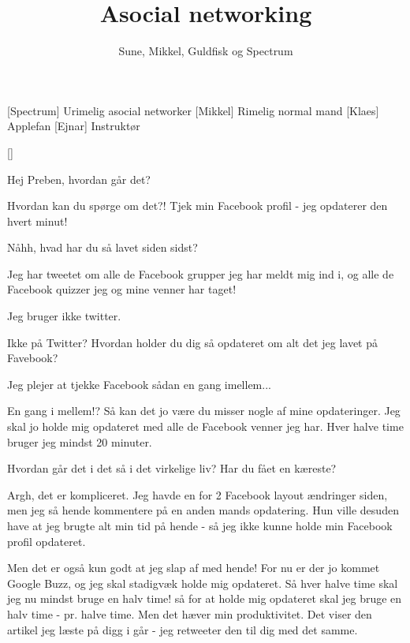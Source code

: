 \documentclass[a4paper,11pt]{article}
\title{Asocial networking}
\author{Sune, Mikkel, Guldfisk og Spectrum}
\begin{document}
\maketitle

\begin{roles}
       [Spectrum] Urimelig asocial networker
       [Mikkel] Rimelig normal mand
       [Klaes] Applefan
       [Ejnar] Instrukt\o{}r
\end{roles}

\begin{props}
[]
\end{props}

\begin{sketch}



 Hej Preben, hvordan g\aa{}r det?

  Hvordan kan du sp\o{}rge om det?! Tjek min Facebook profil - jeg opdaterer den hvert minut!

 N\aa{}hh, hvad har du s\aa{} lavet siden sidst?

 Jeg har tweetet om alle de Facebook grupper jeg har meldt mig ind i, og alle de Facebook quizzer jeg og mine venner har taget!

 Jeg bruger ikke twitter.

 Ikke p\aa{} Twitter? Hvordan holder du dig s\aa{} opdateret om alt det jeg lavet p\aa{} Favebook?

 Jeg plejer at tjekke Facebook s\aa{}dan en gang imellem...

 En gang i mellem!? S\aa{} kan det jo v\ae{}re du misser nogle af mine
opdateringer. Jeg skal jo holde mig opdateret med alle de Facebook venner jeg har. Hver halve time bruger jeg mindst 20 minuter.

 Hvordan g\aa{}r det i det s\aa{} i det virkelige liv? Har du f\aa{}et en k\ae{}reste?

 Argh, det er kompliceret. Jeg havde en for 2 Facebook layout \ae{}ndringer siden, men jeg s\aa{} hende kommentere p\aa{} en anden mands opdatering. Hun ville desuden have at jeg brugte alt min tid p\aa{} hende - s\aa{} jeg ikke kunne holde min Facebook profil opdateret.

 Men det er ogs\aa{} kun godt at jeg slap af med hende! For nu er der jo kommet Google Buzz, og jeg skal stadigv\ae{}k holde mig opdateret. S\aa{} hver halve time skal jeg nu mindst bruge en halv time! s\aa{} for at holde mig opdateret skal jeg bruge en halv time - pr. halve time. Men det h\ae{}ver min produktivitet. Det viser den artikel jeg l\ae{}ste p\aa{} digg i g\aa{}r - jeg retweeter den til dig med det samme.


\end{sketch}
\end{document}

